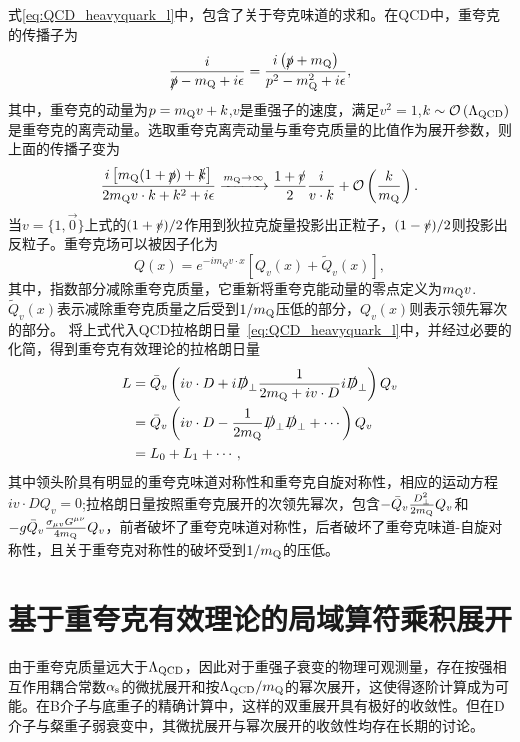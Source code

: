 式\eqref{eq:QCD_heavyquark_l}中，包含了关于夸克味道的求和。在QCD中，重夸克的传播子为
\begin{equation}
    \frac{i}{\slashed{p} - m_{\mathrm{Q}} + i \epsilon} = \frac{i\left(\slashed{p} + m_{\mathrm{Q}}\right)}{p^2 - m_{\mathrm{Q}}^2 + i \epsilon},
\end{equation}
    其中，重夸克的动量为$p=m_{\mathrm{Q}}v+k$,$v$是重强子的速度，满足$v^2=1$,$k\sim \mathcal{O}\left(\Lambda_{\mathrm{\mathrm{QCD}}}\right)$是重夸克的离壳动量。选取重夸克离壳动量与重夸克质量的比值作为展开参数，则上面的传播子变为
    \begin{equation}
        \frac{i\left[m_{\mathrm{Q}}(1+\slashed{p})+\slashed{k}\right]}{2 m_{\mathrm{Q}} v \cdot k + k^2 + i \epsilon} \xrightarrow{m_{\mathrm{Q}} \rightarrow \infty} \frac{1+\slashed{v}}{2} \frac{i}{v \cdot k} + \mathcal{O}\left(\frac{k}{m_{\mathrm{Q}}}\right).
    \end{equation}    
   当$v=\{1,\vec{0}\}$上式的$(1+\slashed{v})/2$作用到狄拉克旋量投影出正粒子，$(1-\slashed{v})/2$则投影出反粒子。重夸克场可以被因子化为
   $$Q(x)=e^{-i m_{Q}v \cdot x}\left[Q_v(x)+\tilde{Q}_v(x)\right],$$
其中，指数部分减除重夸克质量，它重新将重夸克能动量的零点定义为$m_{\mathrm{Q}}v$.$\tilde{Q}_v(x)$表示减除重夸克质量之后受到$1/m_{\mathrm{Q}}$压低的部分，${Q}_v(x)$则表示领先幂次的部分。
将上式代入QCD拉格朗日量~\eqref{eq:QCD_heavyquark_l}中，并经过必要的化简，得到重夸克有效理论的拉格朗日量
\begin{equation}
    \begin{aligned}
    L & =\bar{Q}_v\left(i v \cdot D+i \slashed{D}_{\perp} \frac{1}{2 m_{\mathrm{Q}}+i v \cdot D} i \slashed{D}_{\perp}\right) Q_v \\
    & =\bar{Q}_v\left(i v \cdot D-\frac{1}{2 m_{\mathrm{Q}}} \slashed{D}_{\perp} \slashed{D}_{\perp}+\cdots\right) Q_v \\
    & =L_0+L_1+\cdots,
    \end{aligned}
    \end{equation}
其中领头阶具有明显的重夸克味道对称性和重夸克自旋对称性，相应的运动方程$i v\cdot D Q_{v}=0$;拉格朗日量按照重夸克展开的次领先幂次，包含$-\bar{Q}_v \frac{D_{\perp}^2}{2 m_{\mathrm{Q}}} Q_v$和$-g \bar{Q}_v \frac{\sigma_{\mu v} G^{\mu \nu}}{4 m_{\mathrm{Q}}} Q_v$，前者破坏了重夸克味道对称性，后者破坏了重夸克味道-自旋对称性，且关于重夸克对称性的破坏受到$1/m_{\mathrm{Q}}$的压低。
\section{基于重夸克有效理论的局域算符乘积展开}
由于重夸克质量远大于$\Lambda_{\mathrm{QCD}}$，因此对于重强子衰变的物理可观测量，存在按强相互作用耦合常数$\alpha_{\mathrm{s}}$的微扰展开和按$\Lambda_{\mathrm{QCD}}/m_{\mathrm{Q}}$的幂次展开，这使得逐阶计算成为可能。在B介子与底重子的精确计算中，这样的双重展开具有极好的收敛性。但在D介子与粲重子弱衰变中，其微扰展开与幂次展开的收敛性均存在长期的讨论。

